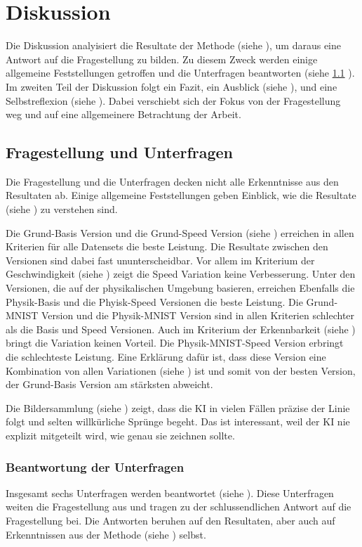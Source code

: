 \chapter{Diskussion}
\label{chap:d}
Die Diskussion analyisiert die Resultate der Methode (siehe ),
um daraus eine Antwort auf die Fragestellung zu bilden. Zu diesem Zweck werden
einige allgemeine Feststellungen getroffen  und die Unterfragen beantworten
(siehe \ref{chap:d_frage} ). Im zweiten Teil der Diskussion folgt ein Fazit,
ein Ausblick (siehe ), und eine Selbstreflexion (siehe
). Dabei verschiebt sich der Fokus von der Fragestellung
weg und auf eine allgemeinere Betrachtung der Arbeit.


\section{Fragestellung und Unterfragen}
\label{chap:d_frage}
Die Fragestellung und die Unterfragen decken nicht alle Erkenntnisse aus den
Resultaten ab. Einige allgemeine Feststellungen geben Einblick, wie die
Resultate (siehe ) zu verstehen sind. 

Die Grund-Basis Version und die Grund-Speed Version (siehe
) erreichen in allen Kriterien für alle Datensets die
beste Leistung. Die Resultate zwischen den Versionen sind dabei fast
ununterscheidbar. Vor allem im Kriterium der Geschwindigkeit (siehe
) zeigt die Speed Variation keine Verbesserung. Unter
den Versionen, die auf der physikalischen Umgebung basieren, erreichen Ebenfalls
die Physik-Basis und die Phyisk-Speed Versionen die beste Leistung. Die
Grund-MNIST Version und die Physik-MNIST Version sind in allen Kriterien
schlechter als die Basis und Speed Versionen. Auch im Kriterium der
Erkennbarkeit (siehe ) bringt die Variation keinen
Vorteil. Die Physik-MNIST-Speed Version erbringt die schlechteste Leistung. Eine
Erklärung dafür ist, dass diese Version eine Kombination von allen Variationen
(siehe ) ist und somit von der besten Version, der
Grund-Basis Version am stärksten abweicht.

Die Bildersammlung (siehe ) zeigt, dass die KI in vielen
Fällen präzise der Linie folgt und selten willkürliche Sprünge begeht. Das ist
interessant, weil der KI nie explizit mitgeteilt wird, wie genau sie zeichnen
sollte.


\subsection{Beantwortung der Unterfragen}
\label{sub:d_frage_unter}
Insgesamt sechs Unterfragen werden beantwortet (siehe ).
Diese Unterfragen weiten die Fragestellung aus und tragen zu der
schlussendlichen Antwort auf die Fragestellung bei. Die Antworten beruhen auf
den Resultaten, aber auch auf Erkenntnissen aus der Methode (siehe
) selbst.

